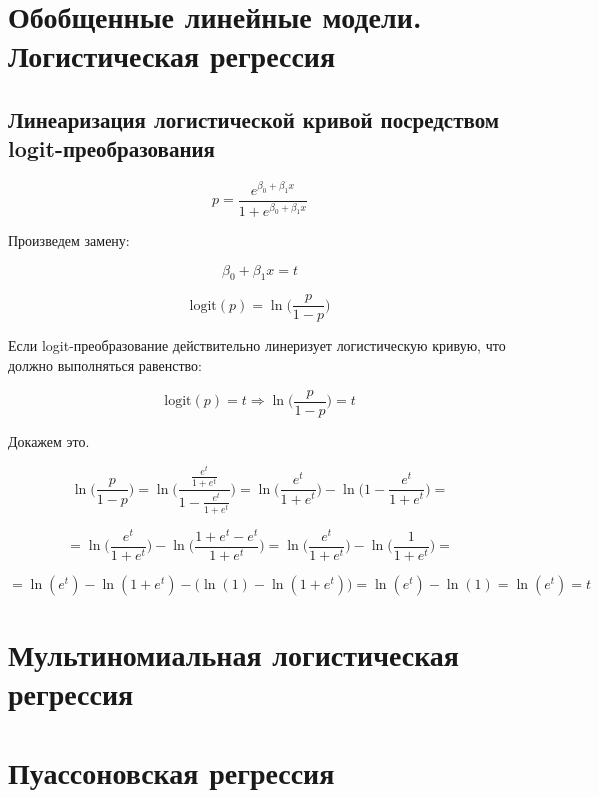 \documentclass[
  letterpaper,
  DIV=11,
  numbers=noendperiod]{scrreprt}
\theoremstyle{definition}
\theoremstyle{remark}
\begin{document}
\chapter{Обобщенные линейные модели. Логистическая
регрессия}\label{andan-logreg}

\section{Линеаризация логистической кривой посредством
logit-преобразования}\label{ux43bux438ux43dux435ux430ux440ux438ux437ux430ux446ux438ux44f-ux43bux43eux433ux438ux441ux442ux438ux447ux435ux441ux43aux43eux439-ux43aux440ux438ux432ux43eux439-ux43fux43eux441ux440ux435ux434ux441ux442ux432ux43eux43c-logit-ux43fux440ux435ux43eux431ux440ux430ux437ux43eux432ux430ux43dux438ux44f}

\[
p = \frac{e^{\beta_0 + \beta_1 x}}{1 + e^{\beta_0 + \beta_1 x}}
\]

Произведем замену:

\[
\beta_0 + \beta_1 x = t
\]

\[
\mathrm{logit}(p) = \ln \Big( \frac{p}{1-p} \Big)
\]

Если logit-преобразование действительно линеризует логистическую кривую,
что должно выполняться равенство:

\[
\mathrm{logit}(p) = t \Rightarrow \ln \Big( \frac{p}{1-p} \Big) = t
\]

Докажем это.

\[
\ln \Big( \frac{p}{1-p} \Big) = 
\ln \Bigg( \frac{\frac{e^t}{1 + e^t}}{1 - \frac{e^t}{1 + e^t}} \Bigg) =
\ln \Big( \frac{e^t}{1 + e^t} \Big) - \ln \Big(1 - \frac{e^t}{1 + e^t} \Big) = 
\]

\[
= \ln \Big( \frac{e^t}{1 + e^t} \Big) - \ln \Big(\frac{1 + e^t - e^t}{1 + e^t} \Big) = 
\ln \Big( \frac{e^t}{1 + e^t} \Big) - \ln \Big( \frac{1}{1 + e^t} \Big) = 
\]

\[
= \ln (e^t) - \ln (1 + e^t) - \big(\ln (1) - \ln (1+e^t)\big) = 
\ln (e^t) - \ln (1) = 
\ln (e^t) = t
\]


\chapter{Мультиномиальная логистическая
регрессия}\label{andan-multinomlogreg}


\chapter{Пуассоновская регрессия}\label{andan-poissonreg}
\end{document}
